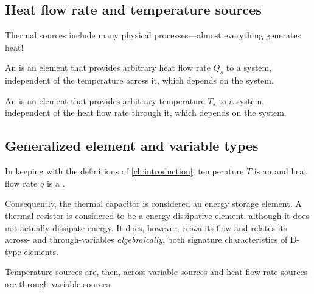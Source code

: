 \documentclass[dynamic_systems.tex]{subfiles}
\begin{document}
\subsection{Heat flow rate and temperature sources}
\tags{}


Thermal sources include many physical processes---almost everything generates heat!
\tags{}

An  is an element that provides arbitrary heat flow rate $Q_s$ to a system, independent of the temperature across it, which depends on the system.

An  is an element that provides arbitrary temperature $T_s$ to a system, independent of the heat flow rate through it, which depends on the system.

\subsection{Generalized element and variable types}
\tags{}

In keeping with the definitions of \cref{ch:introduction}, temperature $T$ is an  and heat flow rate $q$ is a .

Consequently, the thermal capacitor is considered an  energy storage element.
A thermal resistor is considered to be a  energy dissipative element, although it does not actually dissipate energy.
It does, however, \emph{resist} its flow and relates its across- and through-variables \emph{algebraically}, both signature characteristics of D-type elements.

Temperature sources are, then, across-variable sources and heat flow rate sources are through-variable sources.

\end{document}

